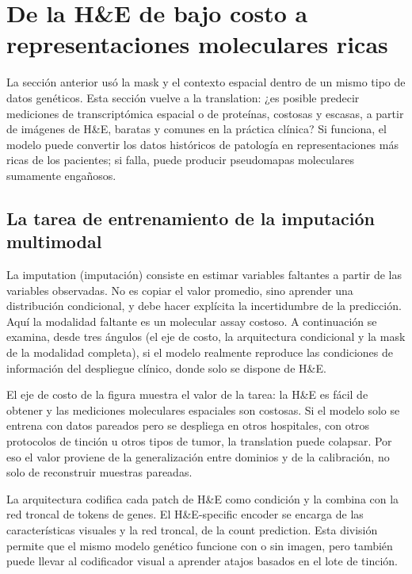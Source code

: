\section{De la H\&E de bajo costo a representaciones moleculares ricas}

La sección anterior usó la mask y el contexto espacial dentro de un mismo tipo de datos genéticos. Esta sección vuelve a la translation: ¿es posible predecir mediciones de transcriptómica espacial o de proteínas, costosas y escasas, a partir de imágenes de H\&E, baratas y comunes en la práctica clínica? Si funciona, el modelo puede convertir los datos históricos de patología en representaciones más ricas de los pacientes; si falla, puede producir pseudomapas moleculares sumamente engañosos.

\subsection{La tarea de entrenamiento de la imputación multimodal}

La imputation (imputación) consiste en estimar variables faltantes a partir de las variables observadas. No es copiar el valor promedio, sino aprender una distribución condicional, y debe hacer explícita la incertidumbre de la predicción. Aquí la modalidad faltante es un molecular assay costoso. A continuación se examina, desde tres ángulos (el eje de costo, la arquitectura condicional y la mask de la modalidad completa), si el modelo realmente reproduce las condiciones de información del despliegue clínico, donde solo se dispone de H\&E.


El eje de costo de la figura muestra el valor de la tarea: la H\&E es fácil de obtener y las mediciones moleculares espaciales son costosas. Si el modelo solo se entrena con datos pareados pero se despliega en otros hospitales, con otros protocolos de tinción u otros tipos de tumor, la translation puede colapsar. Por eso el valor proviene de la generalización entre dominios y de la calibración, no solo de reconstruir muestras pareadas.


La arquitectura codifica cada patch de H\&E como condición y la combina con la red troncal de tokens de genes. El H\&E-specific encoder se encarga de las características visuales y la red troncal, de la count prediction. Esta división permite que el mismo modelo genético funcione con o sin imagen, pero también puede llevar al codificador visual a aprender atajos basados en el lote de tinción.

